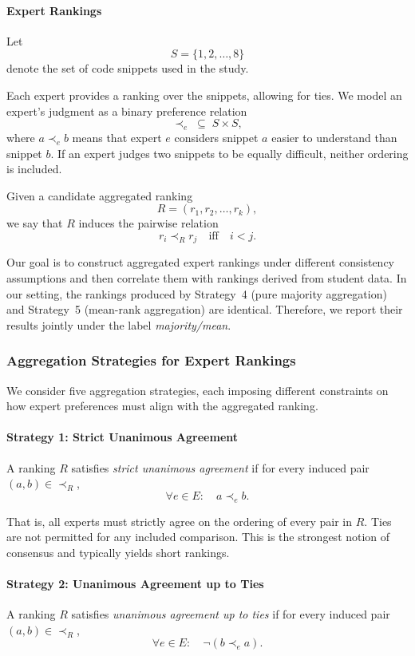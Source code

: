 \paragraph{Expert Rankings}
Let
\[
S = \{1, 2, \dots, 8\}
\]
denote the set of code snippets used in the study.

Each expert provides a ranking over the snippets, allowing for ties.  
We model an expert’s judgment as a binary preference relation
\[
\prec_e \;\subseteq\; S \times S,
\]
where \( a \prec_e b \) means that expert \( e \) considers snippet \( a \) easier to understand than snippet \( b \).
If an expert judges two snippets to be equally difficult, neither ordering is included.

Given a candidate aggregated ranking
\[
R = (r_1, r_2, \dots, r_k),
\]
we say that \( R \) induces the pairwise relation
\[
r_i \prec_R r_j \quad \text{iff} \quad i < j.
\]

Our goal is to construct aggregated expert rankings under different consistency assumptions and then correlate them with rankings derived from student data. In our setting, the rankings produced by Strategy~4 (pure majority aggregation) and Strategy~5 (mean-rank aggregation) are identical. Therefore, we report their results jointly under the label \emph{majority/mean}.

\subsubsection{Aggregation Strategies for Expert Rankings}

We consider five aggregation strategies, each imposing different constraints on how expert preferences must align with the aggregated ranking.

\paragraph{Strategy 1: Strict Unanimous Agreement}
A ranking \( R \) satisfies \emph{strict unanimous agreement} if for every induced pair \( (a,b) \in \prec_R \),
\[
\forall e \in E:\quad a \prec_e b.
\]

That is, all experts must strictly agree on the ordering of every pair in \( R \).
Ties are not permitted for any included comparison.
This is the strongest notion of consensus and typically yields short rankings.

\paragraph{Strategy 2: Unanimous Agreement up to Ties}
A ranking \( R \) satisfies \emph{unanimous agreement up to ties} if for every induced pair \( (a,b) \in \prec_R \),
\[
\forall e \in E:\quad \neg(b \prec_e a).
\]

